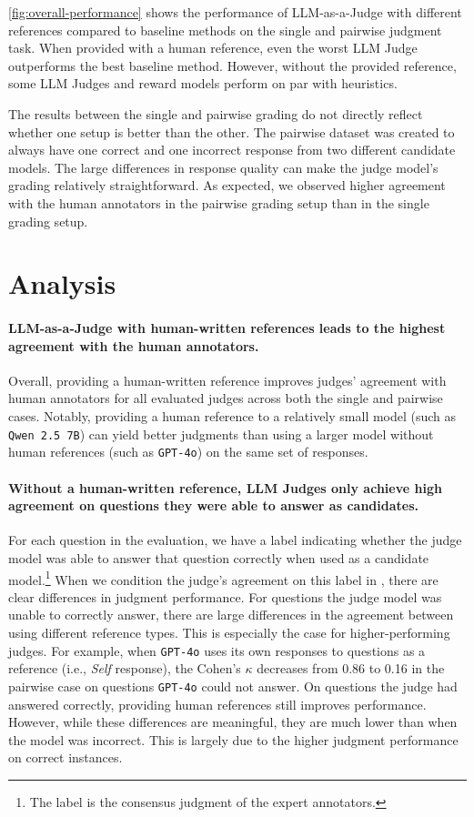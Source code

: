 \documentclass{article}
\begin{document}
\cref{fig:overall-performance} shows the performance of LLM-as-a-Judge with different references compared to baseline methods on the single and pairwise judgment task. When provided with a human reference, even the worst LLM Judge outperforms the best baseline method. However, without the provided reference, some LLM Judges and reward models perform on par with heuristics. 


The results between the single and pairwise grading do not directly reflect whether one setup is better than the other. The pairwise dataset was created to always have one correct and one incorrect response from two different candidate models. The large differences in response quality can make the judge model's grading relatively straightforward. As expected, we observed higher agreement with the human annotators in the pairwise grading setup than in the single grading setup.

\section{Analysis}

\paragraph{LLM-as-a-Judge with human-written references leads to the highest agreement with the human annotators.} Overall, providing a human-written reference improves judges' agreement with human annotators for all evaluated judges across both the single and pairwise cases. Notably, providing a human reference to a relatively small model (such as \texttt{Qwen 2.5 7B}) can yield better judgments than using a larger model without human references (such as \texttt{GPT-4o}) on the same set of responses.

\paragraph{Without a human-written reference, LLM Judges only achieve high agreement on questions they were able to answer as candidates.} For each question in the evaluation, we have a label indicating whether the judge model was able to answer that question correctly when used as a candidate model.\footnote{The label is the consensus judgment of the expert annotators.}  When we condition the judge's agreement on this label in , there are clear differences in judgment performance. For questions the judge model was unable to correctly answer, there are large differences in the agreement between using different reference types. This is especially the case for higher-performing judges. For example, when \texttt{GPT-4o} uses its own responses to questions as a reference (i.e., \textit{Self} response), the Cohen's $\kappa$ decreases from 0.86 to 0.16 in the pairwise case on questions \texttt{GPT-4o} could not answer. On questions the judge had answered correctly, providing human references still improves performance. However, while these differences are meaningful, they are much lower than when the model was incorrect. This is largely due to the higher judgment performance on correct instances.
\end{document}
